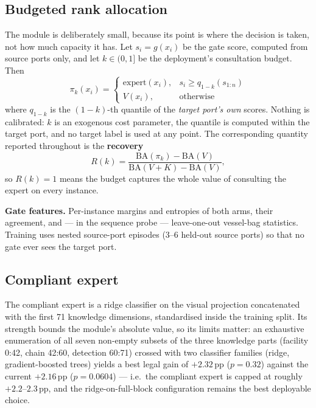 \documentclass[journal]{IEEEtran}
\begin{document}
\subsection{Budgeted rank allocation}

The module is deliberately small, because its point is where the decision is taken, not how much
capacity it has. Let $s_i = g(x_i)$ be the gate score, computed from source ports only, and let
$k \in (0, 1]$ be the deployment's consultation budget. Then
\begin{equation}
\pi_k(x_i) =
\begin{cases}
\text{expert}(x_i), & s_i \ge q_{1-k}(s_{1:n}) \\
V(x_i), & \text{otherwise}
\end{cases}
\end{equation}
where $q_{1-k}$ is the $(1-k)$-th quantile of the \emph{target port's own} scores. Nothing is
calibrated: $k$ is an exogenous cost parameter, the quantile is computed within the target port, and no
target label is used at any point. The corresponding quantity reported throughout is the
\textbf{recovery}
\begin{equation}
R(k) = \frac{\mathrm{BA}(\pi_k) - \mathrm{BA}(V)}{\mathrm{BA}(V{+}K) - \mathrm{BA}(V)},
\end{equation}
so $R(k) = 1$ means the budget captures the whole value of consulting the expert on every instance.

\textbf{Gate features.} Per-instance margins and entropies of both arms, their agreement, and --- in
the sequence probe --- leave-one-out vessel-bag statistics. Training uses nested source-port episodes
(3--6 held-out source ports) so that no gate ever sees the target port.

\subsection{Compliant expert}

The compliant expert is a ridge classifier on the visual projection concatenated with the first 71
knowledge dimensions, standardised inside the training split. Its strength bounds the module's
absolute value, so its limits matter: an exhaustive enumeration of all seven non-empty subsets of the
three knowledge parts (facility 0:42, chain 42:60, detection 60:71) crossed with two classifier
families (ridge, gradient-boosted trees) yields a best legal gain of $+2.32$\,pp ($p = 0.32$) against
the current $+2.16$\,pp ($p = 0.0604$) --- i.e.\ the compliant expert is capped at roughly
$+2.2$--$2.3$\,pp, and the ridge-on-full-block configuration remains the best deployable choice.
\end{document}
